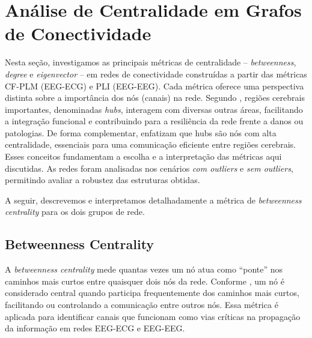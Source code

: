 
\section{Análise de Centralidade em Grafos de Conectividade}
\label{sec:analise_centralidade}

Nesta seção, investigamos as principais métricas de centralidade – \emph{betweenness}, \emph{degree} e \emph{eigenvector} – em redes de conectividade construídas a partir das métricas CF-PLM (EEG-ECG) e PLI (EEG-EEG). Cada métrica oferece uma perspectiva distinta sobre a importância dos nós (canais) na rede. Segundo \cite{rubinov2010complex}, regiões cerebrais importantes, denominadas \emph{hubs}, interagem com diversas outras áreas, facilitando a integração funcional e contribuindo para a resiliência da rede frente a danos ou patologias. De forma complementar, \cite{bullmore2009complex} enfatizam que hubs são nós com alta centralidade, essenciais para uma comunicação eficiente entre regiões cerebrais. Esses conceitos fundamentam a escolha e a interpretação das métricas aqui discutidas. As redes foram analisadas nos cenários \emph{com outliers} e \emph{sem outliers}, permitindo avaliar a robustez das estruturas obtidas.

A seguir, descrevemos e interpretamos detalhadamente a métrica de \emph{betweenness centrality} para os dois grupos de rede.

\subsection{Betweenness Centrality}

A \emph{betweenness centrality} mede quantas vezes um nó atua como “ponte” nos caminhos mais curtos entre quaisquer dois nós da rede. Conforme \cite{freeman1977set}, um nó é considerado central quando participa frequentemente dos caminhos mais curtos, facilitando ou controlando a comunicação entre outros nós. Essa métrica é aplicada para identificar canais que funcionam como vias críticas na propagação da informação em redes EEG-ECG e EEG-EEG.

